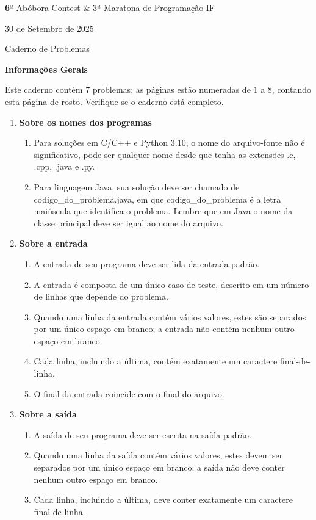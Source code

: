 
\begin{center}
 {\large {\textbf 
6º Abóbora Contest \& 3ª Maratona de Programação IF}}


{\large 30 de Setembro de 2025}

{\large  Caderno de Problemas}

{\large \textbf{Informações Gerais}}
\end{center}

Este caderno contém $7$ problemas; as páginas estão numeradas de $1$ a $8$,  contando esta página de rosto. Verifique se o caderno está completo.

\begin{enumerate}
    \item \textbf{Sobre os nomes dos programas}
    \begin{enumerate}
        \item Para soluções em C/C++ e Python 3.10, o nome do arquivo-fonte não é significativo, pode ser qualquer nome desde que tenha as extensões .c, .cpp, .java e .py.
        \item Para linguagem Java, sua solução deve ser chamado de codigo\_do\_problema.java, em que codigo\_do\_problema é a letra maiúscula que identifica o problema. Lembre que em Java o nome da classe principal deve ser igual ao nome do arquivo.
    \end{enumerate}
    \item \textbf{Sobre a entrada}
    \begin{enumerate}
        \item A entrada de seu programa deve ser lida da entrada padrão.
        \item A entrada é composta de um único caso de teste, descrito em um número de linhas que depende do problema.
        \item Quando uma linha da entrada contém vários valores, estes são separados por um único espaço em branco; a entrada não contém nenhum outro espaço em branco.
        \item Cada linha, incluindo a última, contém exatamente um caractere final-de-linha.
        \item O final da entrada coincide com o final do arquivo.
    \end{enumerate}
    \item \textbf{Sobre a saída}
    \begin{enumerate}
        \item A saída de seu programa deve ser escrita na saída padrão.
        \item Quando uma linha da saída contém vários valores, estes devem ser separados por um único espaço em branco; a saída não deve conter nenhum outro espaço em branco.
        \item Cada linha, incluindo a última, deve conter exatamente um caractere final-de-linha.
    \end{enumerate}
\end{enumerate}

\newpage
